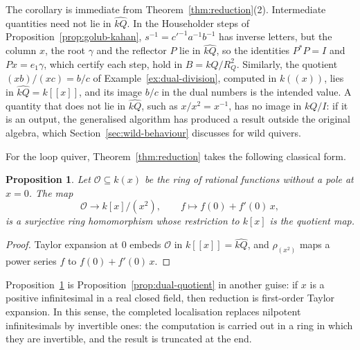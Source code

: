 \documentclass[12pt, a4paper]{report}
\theoremstyle{plain}
\newtheorem{proposition}[theorem]{Proposition}
\theoremstyle{definition}
\theoremstyle{remark}
\theoremstyle{plain}
\begin{document}
The corollary is immediate from Theorem~\ref{thm:reduction}(2). Intermediate quantities need not lie in $\widehat{kQ}$. In the Householder steps of Proposition~\ref{prop:golub-kahan}, $s^{-1}=c'^{-1}a^{-1}b^{-1}$ has inverse letters, but the column $x$, the root $\gamma$ and the reflector $P$ lie in $\widehat{kQ}$, so the identities $P^*P=I$ and $Px=e_1\gamma$, which certify each step, hold in $B=kQ/R_Q^2$. Similarly, the quotient $(xb)/(xc)=b/c$ of Example~\ref{ex:dual-division}, computed in $k((x))$, lies in $\widehat{kQ}=k[[x]]$, and its image $b/c$ in the dual numbers is the intended value. A quantity that does not lie in $\widehat{kQ}$, such as $x/x^2=x^{-1}$, has no image in $kQ/I$: if it is an output, the generalised algorithm has produced a result outside the original algebra, which Section~\ref{sec:wild-behaviour} discusses for wild quivers.

For the loop quiver, Theorem~\ref{thm:reduction} takes the following classical form.

\begin{proposition}\label{prop:reduction-loop}
Let $\mathcal O\subseteq k(x)$ be the ring of rational functions without a pole at $x=0$. The map
\[ \mathcal O\to k[x]/(x^2),\qquad f\mapsto f(0)+f'(0)\,x, \]
is a surjective ring homomorphism whose restriction to $k[x]$ is the quotient map.
\end{proposition}
\begin{proof}
Taylor expansion at $0$ embeds $\mathcal O$ in $k[[x]]=\widehat{kQ}$, and $\rho_{(x^2)}$ maps a power series $f$ to $f(0)+f'(0)\,x$.
\end{proof}

Proposition~\ref{prop:reduction-loop} is Proposition~\ref{prop:dual-quotient} in another guise: if $x$ is a positive infinitesimal in a real closed field, then reduction is first-order Taylor expansion. In this sense, the completed localisation replaces nilpotent infinitesimals by invertible ones: the computation is carried out in a ring in which they are invertible, and the result is truncated at the end.
\end{document}
